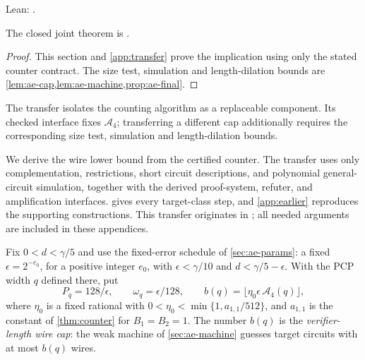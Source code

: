 \documentclass[11pt,letterpaper]{article}
\theoremstyle{definition}
\theoremstyle{remark}
\begin{document}
Lean: .\par\noindent
The closed joint theorem is .
\begin{proof}
This section and \cref{app:transfer} prove the implication using only the stated counter contract. The size test, simulation and length-dilation bounds are \cref{lem:ae-cap,lem:ae-machine,prop:ae-final}.
\end{proof}
The transfer isolates the counting algorithm as a replaceable component. Its checked interface fixes \(\mathcal A_4\); transferring a different cap additionally requires the corresponding size test, simulation and length-dilation bounds.


We derive the wire lower bound from the certified counter.
The transfer uses only complementation, restrictions, short circuit
descriptions, and polynomial general-circuit simulation, together
with the derived proof-system, refuter, and amplification interfaces.
 gives every target-class step, and
\cref{app:earlier} reproduces the supporting constructions.
This transfer originates in \cite[Section~11]{NagCG}; all needed
arguments are included in these appendices.

Fix \(0<d<\gamma/5\) and use the fixed-error schedule
of \cref{sec:ae-params}: a fixed \(\epsilon=2^{-e_0}\), for a
positive integer \(e_0\), with \(\epsilon<\gamma/10\) and
\(d<\gamma/5-\epsilon\). With the PCP width \(q\) defined there, put
\[
 P_q=128/\epsilon,\qquad\omega_q=\epsilon/128,\qquad
 b(q)=\bigl\lfloor\eta_0\epsilon\,\mathcal A_4(q)\bigr\rfloor,
\]
where \(\eta_0\) is a fixed rational with \(0<\eta_0<\min\{1,a_{1,1}/512\}\), and
\(a_{1,1}\) is the constant of \cref{thm:counter} for
\(B_1=B_2=1\). The number \(b(q)\) is the \emph{verifier-length wire cap}: the
weak machine of \cref{sec:ae-machine} guesses target circuits with
at most \(b(q)\) wires.
\end{document}
